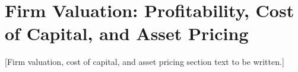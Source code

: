 
\section{Firm Valuation: Profitability, Cost of Capital, and Asset Pricing}
\label{sec:valuation}


[Firm valuation, cost of capital, and asset pricing section text to be written.]

